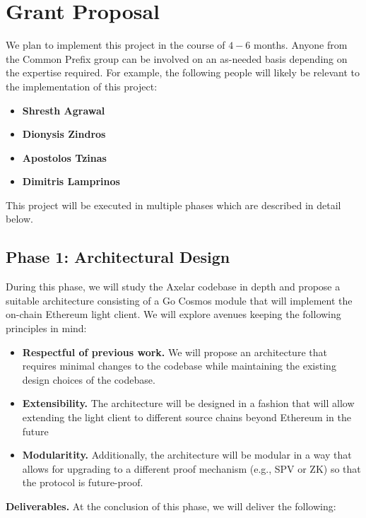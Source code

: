 \section{Grant Proposal}

We plan to implement this project in the course of $4-6$ months. Anyone from the Common Prefix group
can be involved on an as-needed basis depending on the expertise required. For example, the following
people will likely be relevant to the implementation of this project:

\begin{itemize}
  \item \textbf{Shresth Agrawal}
  \item \textbf{Dionysis Zindros}
  \item \textbf{Apostolos Tzinas}
  \item \textbf{Dimitris Lamprinos}
\end{itemize}

This project will be executed in multiple phases which are described in detail below.

\subsection{Phase 1: Architectural Design}
During this phase, we will study the Axelar codebase in depth and propose a suitable architecture consisting of a Go Cosmos module that will implement the on-chain Ethereum light client.
We will explore avenues keeping the following principles in mind: 
\begin{itemize}
  \item \textbf{Respectful of previous work.} We will propose an architecture that requires minimal changes to the codebase while maintaining the existing design choices of the codebase.
  \item \textbf{Extensibility.} The architecture will be designed in a fashion that will allow extending the light client to different source chains beyond Ethereum in the future  
  \item \textbf{Modularitity.} Additionally, the architecture will be modular in a way that allows for upgrading to a different proof mechanism (e.g., SPV or ZK) so that the protocol is future-proof.
\end{itemize}
\noindent
\textbf{Deliverables.} At the conclusion of this phase, we will deliver the following:

